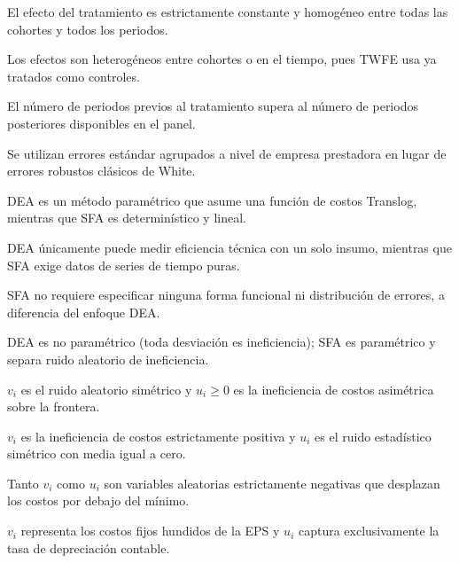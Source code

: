 \begin{opts}
    \item El efecto del tratamiento es estrictamente constante y homogéneo entre todas las cohortes y todos los periodos.
    \item Los efectos son heterogéneos entre cohortes o en el tiempo, pues TWFE usa ya tratados como controles.
    \item El número de periodos previos al tratamiento supera al número de periodos posteriores disponibles en el panel.
    \item Se utilizan errores estándar agrupados a nivel de empresa prestadora en lugar de errores robustos clásicos de White.
\end{opts}

\begin{opts}
    \item DEA es un método paramétrico que asume una función de costos Translog, mientras que SFA es determinístico y lineal.
    \item DEA únicamente puede medir eficiencia técnica con un solo insumo, mientras que SFA exige datos de series de tiempo puras.
    \item SFA no requiere especificar ninguna forma funcional ni distribución de errores, a diferencia del enfoque DEA.
    \item DEA es no paramétrico (toda desviación es ineficiencia); SFA es paramétrico y separa ruido aleatorio de ineficiencia.
\end{opts}

\begin{opts}
    \item $v_i$ es el ruido aleatorio simétrico y $u_i \ge 0$ es la ineficiencia de costos asimétrica sobre la frontera.
    \item $v_i$ es la ineficiencia de costos estrictamente positiva y $u_i$ es el ruido estadístico simétrico con media igual a cero.
    \item Tanto $v_i$ como $u_i$ son variables aleatorias estrictamente negativas que desplazan los costos por debajo del mínimo.
    \item $v_i$ representa los costos fijos hundidos de la EPS y $u_i$ captura exclusivamente la tasa de depreciación contable.
\end{opts}

